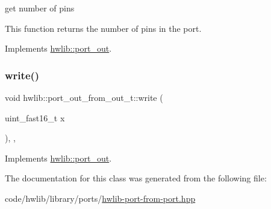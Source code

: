get number of pins

This function returns the number of pins in the port. 

Implements \hyperlink{classhwlib_1_1port__out_a8593e2ff755b938797defb06c1e085df}{hwlib\+::port\+\_\+out}.

\mbox{\label{classhwlib_1_1port__out__from__out__t_a42fc682057ea78b827900e95cb3e0d0c}} 
\subsubsection{\texorpdfstring{write()}{write()}}
{\footnotesize\ttfamily void hwlib\+::port\+\_\+out\+\_\+from\+\_\+out\+\_\+t\+::write (\begin{DoxyParamCaption}\item[{uint\+\_\+fast16\+\_\+t}]{x }\end{DoxyParamCaption})\hspace{0.3cm}{\ttfamily [inline]}, {\ttfamily [override]}, {\ttfamily [virtual]}}







Implements \hyperlink{classhwlib_1_1port__out_a3644bf484ebe059ec5bf17fa43e0c01b}{hwlib\+::port\+\_\+out}.



The documentation for this class was generated from the following file\+:\begin{DoxyCompactItemize}
\item 
code/hwlib/library/ports/\hyperlink{hwlib-port-from-port_8hpp}{hwlib-\/port-\/from-\/port.\+hpp}\end{DoxyCompactItemize}

